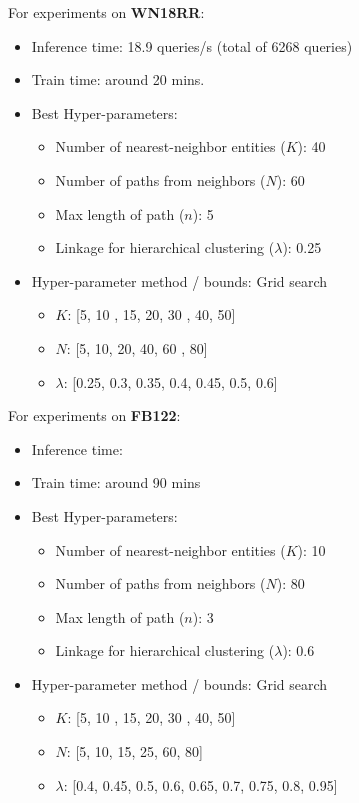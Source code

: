 \documentclass[11pt,a4paper]{article}
\newcommand{\fb}{FB122\xspace}
\newcommand{\wn}{WN18RR\xspace}
\begin{document}
For experiments on \textbf{\wn}:
\begin{itemize}
    \item Inference time: 18.9 queries/s (total of 6268 queries)
    \item Train time: around 20 mins.
    \item Best Hyper-parameters: 
    \begin{itemize}
        \item Number of nearest-neighbor entities ($K$): 40
        \item Number of paths from neighbors ($N$): 60
        \item Max length of path ($n$): 5
        \item Linkage for hierarchical clustering ($\lambda$): 0.25
    \end{itemize}
    \item Hyper-parameter method / bounds: Grid search
    \begin{itemize}
        \item $K$: [5, 10 , 15, 20, 30 , 40, 50]
        \item $N$: [5, 10, 20, 40, 60 , 80]
        \item $\lambda$: [0.25, 0.3, 0.35, 0.4, 0.45, 0.5, 0.6]
    \end{itemize}
     
\end{itemize}

For experiments on \textbf{\fb}:
\begin{itemize}
    \item Inference time: 
    \item Train time: around 90 mins
    \item Best Hyper-parameters: 
    \begin{itemize}
        \item Number of nearest-neighbor entities ($K$): 10
        \item Number of paths from neighbors ($N$): 80
        \item Max length of path ($n$): 3
        \item Linkage for hierarchical clustering ($\lambda$): 0.6
    \end{itemize}
    \item Hyper-parameter method / bounds: Grid search
    \begin{itemize}
        \item $K$: [5, 10 , 15, 20, 30 , 40, 50]
        \item $N$: [5, 10, 15, 25, 60, 80]
        \item $\lambda$: [0.4, 0.45, 0.5, 0.6, 0.65, 0.7, 0.75, 0.8, 0.95]
    \end{itemize}
\end{itemize}
\end{document}

